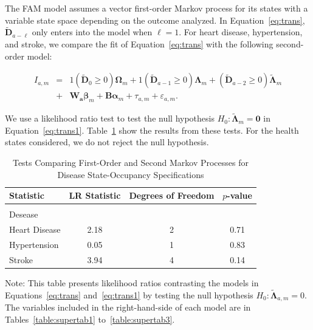 \noindent The FAM model assumes a vector first-order Markov process for its states with a variable state space depending on the outcome analyzed. In Equation~\eqref{eq:trans}, $\tilde{\bm{D}}_{a - \ell}$ only enters into the model when $\ell = 1$. For heart disease, hypertension, and stroke, we compare the fit of Equation~\eqref{eq:trans} with the following second-order model: 

\begin{eqnarray}
I_{a,m} &=&  \bm{\mathit{1}} \left( \tilde{\bm{D}}_{0} \geq 0 \right) \bm{\Omega}_{m} + \bm{\mathit{1}} \left( \tilde{\bm{D}}_{a-1} \geq 0\right) \bm{\Lambda}_{m}  + \left( \tilde{\bm{D}}_{a-2} \geq 0\right) \tilde{\bm{\Lambda}}_{m} \nonumber \\
&+& \bm{W_a} \bm{\beta}_{m} + \bm{B} \bm{\alpha}_m + \tau_{a,m} + \varepsilon_{a,m}. \label{eq:trans1}
\end{eqnarray}

We use a likelihood ratio test to test the null hypothesis $H_0: \tilde{\bm{\Lambda}}_{m} = \bm{0}$ in Equation~\eqref{eq:trans1}. Table~\ref{table:lrtests} show the results from these tests. For the health states considered, we do not reject the null hypothesis.

\begin{table}[H]
\begin{threeparttable}
\caption{Tests Comparing First-Order and Second Markov Processes for Disease State-Occupancy Specifications} \label{table:lrtests}
\centering
\footnotesize
\begin{tabular}{lccc}
\toprule
Statistic & LR Statistic & Degrees of Freedom & $p$-value \\
\midrule \\
Desease & \\
Heart Disease & 2.18 & 2 & 0.71 \\
Hypertension   & 0.05 & 1 & 0.83 \\
Stroke              & 3.94 & 4 & 0.14 \\
\bottomrule
\end{tabular}
\begin{tablenotes}
\footnotesize
\item Note: This table presents likelihood ratios contrasting the models in Equations~\eqref{eq:trans} and~\eqref{eq:trans1} by testing the null hypothesis $H_0: \tilde{\bm{\Lambda}}_{a,m}=0$. The variables included in the right-hand-side of each model are in Tables~\ref{table:supertab1} to~\ref{table:supertab3}. 
\end{tablenotes}
\end{threeparttable}
\end{table}

